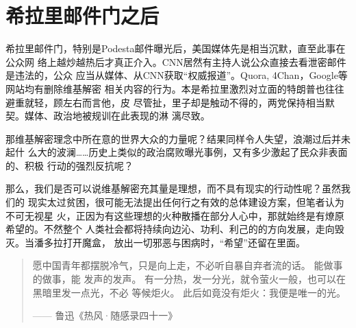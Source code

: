 \section{希拉里邮件门之后}

希拉里邮件门，特别是Podesta邮件曝光后，美国媒体先是相当沉默，直至此事在公众网
络上越炒越热后才真正介入。CNN居然有主持人说公众直接去看泄密邮件是违法的，公众
应当从媒体、从CNN获取“权威报道”。Quora, 4Chan，Google等网站均有删除维基解密
相关内容的行为。本是希拉里激烈对立面的特朗普也往往避重就轻，顾左右而言他，皮
尽管扯，里子却是触动不得的，两党保持相当默契。媒体、政治地被规训在此表现的淋
漓尽致。

那维基解密理念中所在意的世界大众的力量呢？结果同样令人失望，浪潮过后并未起什
么大的波澜……历史上类似的政治腐败曝光事例，又有多少激起了民众非表面的、积极
行动的强烈反抗呢？

那么，我们是否可以说维基解密充其量是理想，而不具有现实的行动性呢？虽然我们的
现实太过贫困，很可能无法提出任何行之有效的总体建设方案，但笔者认为不可无视星
火，正因为有这些理想的火种散播在部分人心中，那就始终是有燎原希望的。不然整个
人类社会都将持续向边沁、功利、利己的的方向发展，走向毁灭。当潘多拉打开魔盒，
放出一切邪恶与困病时，“希望”还留在里面。

\begin{quotation}
  愿中国青年都摆脱冷气，只是向上走，不必听自暴自弃者流的话。 能做事的做事，能
  发声的发声。 有一分热，发一分光，就令萤火一般，也可以在黑暗里发一点光，不必
  等候炬火。 此后如竟没有炬火：我便是唯一的光。

  \raggedleft
  —— 鲁迅\quad 《热风·随感录四十一》 \qquad
\end{quotation}
